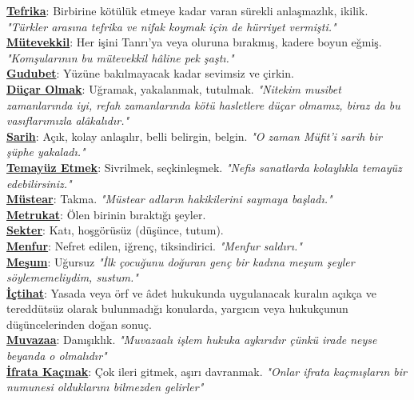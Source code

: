\documentclass[twocolumn]{article}
\begin{document}
\noindent \underline{\textbf{Tefrika}}:\textsf{ Birbirine kötülük etmeye kadar varan sürekli anlaşmazlık, ikilik. }\textit{"Türkler arasına tefrika ve nifak koymak için de hürriyet vermişti."} \\
\noindent \underline{\textbf{Mütevekkil}}:\textsf{ Her işini Tanrı'ya veya oluruna bırakmış, kadere boyun eğmiş. }\textit{"Komşularının bu mütevekkil hâline pek şaştı."} \\
\noindent \underline{\textbf{Gudubet}}:\textsf{ Yüzüne bakılmayacak kadar sevimsiz ve çirkin. }\textit{} \\
\noindent \underline{\textbf{Düçar Olmak}}:\textsf{ Uğramak, yakalanmak, tutulmak. }\textit{"Nitekim musibet zamanlarında iyi, refah zamanlarında kötü hasletlere düçar olmamız, biraz da bu vasıflarımızla alâkalıdır."} \\
\noindent \underline{\textbf{Sarih}}:\textsf{ Açık, kolay anlaşılır, belli belirgin, belgin. }\textit{"O zaman Müfit'i sarih bir şüphe yakaladı."} \\
\noindent \underline{\textbf{Temayüz Etmek}}:\textsf{ Sivrilmek, seçkinleşmek. }\textit{"Nefis sanatlarda kolaylıkla temayüz edebilirsiniz."} \\
\noindent \underline{\textbf{Müstear}}:\textsf{ Takma. }\textit{"Müstear adların hakikilerini saymaya başladı."} \\
\noindent \underline{\textbf{Metrukat}}:\textsf{ Ölen birinin bıraktığı şeyler. }\textit{} \\
\noindent \underline{\textbf{Sekter}}:\textsf{ Katı, hoşgörüsüz (düşünce, tutum). }\textit{} \\
\noindent \underline{\textbf{Menfur}}:\textsf{ Nefret edilen, iğrenç, tiksindirici. }\textit{"Menfur saldırı."} \\
\noindent \underline{\textbf{Meşum}}:\textsf{ Uğursuz }\textit{"İlk çocuğunu doğuran genç bir kadına meşum şeyler söylememeliydim, sustum."} \\
\noindent \underline{\textbf{İçtihat}}:\textsf{ Yasada veya örf ve âdet hukukunda uygulanacak kuralın açıkça ve tereddütsüz olarak bulunmadığı konularda, yargıcın veya hukukçunun düşüncelerinden doğan sonuç. }\textit{} \\
\noindent \underline{\textbf{Muvazaa}}:\textsf{ Danışıklık. }\textit{"Muvazaalı işlem hukuka aykırıdır çünkü irade neyse beyanda o olmalıdır"} \\
\noindent \underline{\textbf{İfrata Kaçmak}}:\textsf{ Çok ileri gitmek, aşırı davranmak. }\textit{"Onlar ifrata kaçmışların bir numunesi olduklarını bilmezden gelirler"} \\
\end{document}
